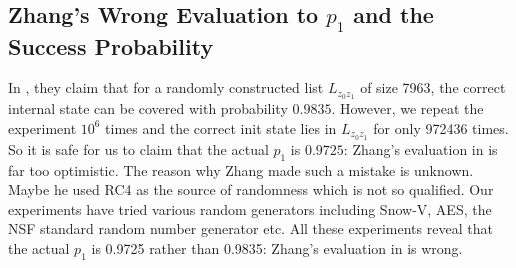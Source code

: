 \subsection{Zhang's Wrong Evaluation to $p_1$ and the Success Probability}\label{sec:ZhangWrongP1}
In \cite{AC:Zhang19}, they claim that for a randomly constructed list $L_{z_0z_1}$ of size 7963, the correct internal state can be covered with probability $0.9835$.
However, we repeat the experiment $10^6$ times and the correct init state lies in $L_{z_0z_1}$ for only 972436 times.
So it is safe for us to claim that the actual $p_1$ is $0.9725$: Zhang's evaluation in \cite{AC:Zhang19} is far too optimistic.
The reason why Zhang made such a mistake is unknown.
Maybe he used RC4 as the source of randomness which is not so qualified.
Our experiments have tried various random generators including Snow-V, AES, the NSF standard random number generator etc.
All these experiments reveal that the actual $p_1$ is 0.9725 rather than 0.9835: Zhang's evaluation in \cite{AC:Zhang19} is wrong.


